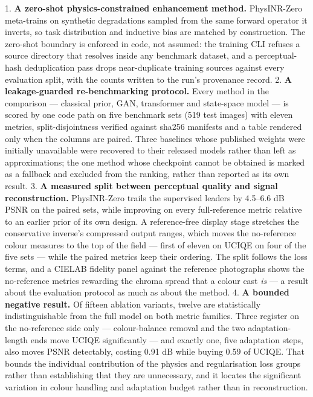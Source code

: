\documentclass[journal]{IEEEtran}
\begin{document}
1. \textbf{A zero-shot physics-constrained enhancement method.} PhysINR-Zero    meta-trains on synthetic degradations sampled from the same forward operator    it inverts, so task distribution and inductive bias are matched by    construction. The zero-shot boundary is enforced in code, not assumed: the    training CLI refuses a source directory that resolves inside any benchmark    dataset, and a perceptual-hash deduplication pass drops near-duplicate    training sources against every evaluation split, with the counts written to    the run's provenance record. 2. \textbf{A leakage-guarded re-benchmarking protocol.} Every method in the    comparison --- classical prior, GAN, transformer and state-space model --- is    scored by one code path on five benchmark sets (519 test images) with eleven    metrics, split-disjointness verified against sha256 manifests and a table    rendered only when the columns are paired. Three baselines whose published    weights were initially unavailable were recovered to their released models    rather than left as approximations; the one method whose checkpoint cannot be    obtained is marked as a fallback and excluded from the ranking, rather than    reported as its own result. 3. \textbf{A measured split between perceptual quality and signal reconstruction.}    PhysINR-Zero trails the supervised leaders by 4.5--6.6 dB PSNR on the    paired sets, while improving on every full-reference metric relative to an    earlier prior of its own design. A reference-free display stage stretches    the conservative inverse's compressed output ranges, which moves the    no-reference colour measures to the top of the field --- first of eleven on    UCIQE on four of the five sets --- while the paired metrics keep their    ordering. The split follows the loss    terms, and a CIELAB fidelity panel against the reference photographs shows    the no-reference metrics rewarding the chroma spread that a colour cast    \emph{is} --- a result about the evaluation protocol as much as about the method. 4. \textbf{A bounded negative result.} Of fifteen ablation variants, twelve are    statistically indistinguishable from the full model on both metric    families. Three register on the no-reference side only --- colour-balance    removal and the two adaptation-length ends move UCIQE significantly --- and    exactly one, five adaptation steps, also moves PSNR detectably, costing    0.91 dB while buying 0.59 of UCIQE. That bounds the individual    contribution of the physics and regularisation loss groups rather than    establishing that they are unnecessary, and it locates the significant    variation in colour handling and adaptation budget rather than in    reconstruction.
\end{document}
